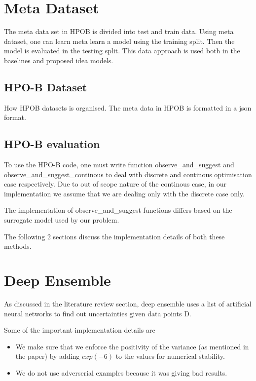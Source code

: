 \documentclass[11pt]{report}
\begin{document}
\section{Meta Dataset}
The meta data set in HPOB is divided into test and train data.
Using meta dataset,  one can learn meta learn a model using the training split.
Then the model is evaluated in the testing split.
This data approach is used both in the baselines and proposed idea models.

\subsection{HPO-B Dataset}
How HPOB datasets is organised.
The meta data in HPOB is formatted in a json format.

\subsection{HPO-B evaluation}
To use the HPO-B code,  one must write function observe\_and\_suggest and observe\_and\_suggest\_continous to deal with discrete and continous optimisation case respectively.
Due to out of scope nature of the continous case,  in our implementation we assume that we are dealing only with the discrete case only.

The implementation of observe\_and\_suggest functions differs based on the surrogate model used by our problem.

The following 2 sections discuss the implementation details of both these methods.



\section{Deep Ensemble}
As discussed in the literature review section,  deep ensemble uses a list of artificial neural networks to find out uncertainties given data points D.

Some of the important implementation details are
\begin{itemize}
\item We make sure that we enforce the positivity of the variance (as mentioned in the paper) by adding $exp(-6)$ to the values for numerical stability.
\item We do not use adverserial examples because it was giving bad results.
\end{itemize}
    
\end{document}
